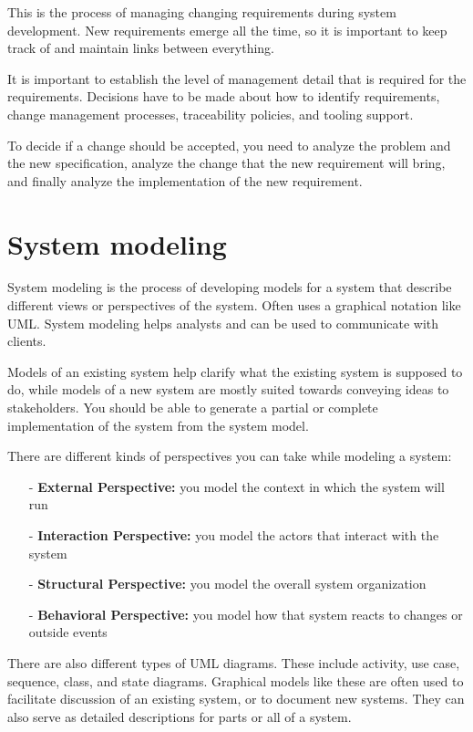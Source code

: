 \documentclass[12pt]{article}
\begin{document}
This is the process of managing changing requirements during system development. New requirements emerge all the time, so it is important to keep track of and maintain links between everything.

It is important to establish the level of management detail that is required for the requirements. Decisions have to be made about how to identify requirements, change management processes, traceability policies, and tooling support.

To decide if a change should be accepted, you need to analyze the problem and the new specification, analyze the change that the new requirement will bring, and finally analyze the implementation of the new requirement.

\pagebreak
\section*{System modeling}

System modeling is the process of developing models for a system that describe different views or perspectives of the system. Often uses a graphical notation like UML. System modeling helps analysts and can be used to communicate with clients.

Models of an existing system help clarify what the existing system is supposed to do, while models of a new system are mostly suited towards conveying ideas to stakeholders. You should be able to generate a partial or complete implementation of the system from the system model.

There are different kinds of perspectives you can take while modeling a system:
\begin{itemize}
    \item [-] \textbf{External Perspective:} you model the context in which the system will run

    \item [-] \textbf{Interaction Perspective:} you model the actors that interact with the system

    \item [-] \textbf{Structural Perspective:} you model the overall system organization

    \item [-] \textbf{Behavioral Perspective:} you model how that system reacts to changes or outside events
\end{itemize}

There are also different types of UML diagrams. These include activity, use case, sequence, class, and state diagrams. Graphical models like these are often used to facilitate discussion of an existing system, or to document new systems. They can also serve as detailed descriptions for parts or all of a system.
\end{document}

